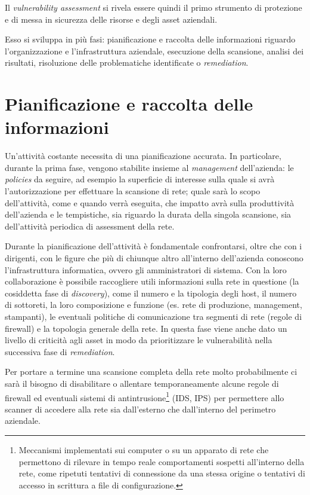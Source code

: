 \documentclass[target=bach,aauheader=]{thud}
\begin{document}
Il \textit{vulnerability assessment} si rivela essere quindi il primo strumento di protezione e di messa in sicurezza delle risorse e degli asset aziendali.

Esso si sviluppa in più fasi: pianificazione e raccolta delle informazioni riguardo l’organizzazione e l’infrastruttura aziendale, esecuzione della scansione, analisi dei risultati, risoluzione delle problematiche identificate o \textit{remediation}.


\section{Pianificazione e raccolta delle informazioni}
Un’attività costante necessita di una pianificazione accurata. In particolare, durante la prima fase, vengono stabilite insieme al \textit{management} dell’azienda: le \textit{policies} da seguire, ad esempio la superficie di interesse sulla quale si avrà l’autorizzazione per effettuare la scansione di rete; quale sarà lo scopo dell’attività, come e quando verrà eseguita, che impatto avrà sulla produttività dell’azienda e le tempistiche, sia riguardo la durata della singola scansione, sia dell’attività periodica di assessment della rete.

Durante la pianificazione dell’attività è fondamentale confrontarsi, oltre che con i dirigenti, con le figure che più di chiunque altro all’interno dell’azienda conoscono l’infrastruttura informatica, ovvero gli amministratori di sistema. Con la loro collaborazione è possibile raccogliere utili informazioni sulla rete in questione (la cosiddetta fase di \textit{discovery}), come il numero e la tipologia degli host, il numero di sottoreti, la loro composizione e funzione (es. rete di produzione, management, stampanti), le eventuali politiche di comunicazione tra segmenti di rete (regole di firewall) e la topologia generale della rete. In questa fase viene anche dato un livello di criticità agli asset in modo da prioritizzare le vulnerabilità nella successiva fase di \textit{remediation}.

Per portare a termine una scansione completa della rete molto probabilmente ci sarà il bisogno di disabilitare o allentare temporaneamente alcune regole di firewall ed eventuali sistemi di antintrusione\footnote{Meccanismi implementati sui computer o su un apparato di rete che permettono di rilevare in tempo reale comportamenti sospetti all’interno della rete, come ripetuti tentativi di connessione da una stessa origine o tentativi di accesso in scrittura a file di configurazione.} (IDS, IPS) per permettere allo scanner di accedere alla rete sia dall’esterno che dall’interno del perimetro aziendale. 
\end{document}
